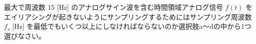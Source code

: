 最大で周波数 $15$ [Hz] のアナログサイン波を含む時間領域アナログ信号 $f(t)$ をエイリアシングが起きないようにサンプリングするためにはサンプリング周波数 $f_s$ [Hz] を最低でもいくつ以上にしなければならないのか選択肢a〜dの中から1つ選びなさい。
